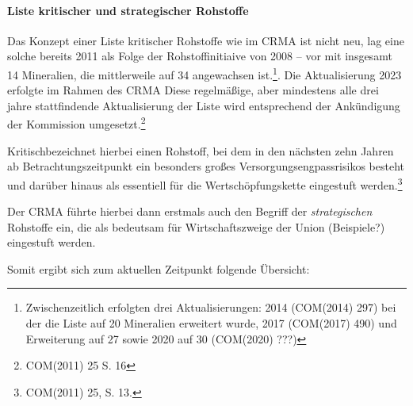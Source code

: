 \documentclass[12pt,a4paper,oneside]{book} %
\begin{document}
	
	\paragraph{Liste kritischer und strategischer Rohstoffe}
	
	Das Konzept einer Liste kritischer Rohstoffe wie im CRMA ist nicht neu, lag eine solche bereits 2011 als Folge der Rohstoffinitiaive von 2008 -- vor mit insgesamt 14 Mineralien, die mittlerweile auf 34 angewachsen ist.\footnote{Zwischenzeitlich erfolgten drei Aktualisierungen: 2014 (COM(2014) 297) bei der die Liste auf 20 Mineralien erweitert wurde, 2017 (COM(2017) 490) und Erweiterung auf 27 sowie 2020 auf 30 (COM(2020) ???)}. Die Aktualisierung 2023 erfolgte im Rahmen des CRMA%
	Diese regelmäßige, aber mindestens alle drei jahre stattfindende Aktualisierung der Liste wird entsprechend der Ankündigung der Kommission umgesetzt.\footnote{COM(2011) 25 S. 16}
	
	\glqq Kritisch\grqq bezeichnet hierbei einen Rohstoff, bei dem in den nächsten zehn Jahren ab Betrachtungszeitpunkt ein besonders großes Versorgungsengpassrisikos besteht und darüber hinaus als essentiell für die Wertschöpfungskette eingestuft werden.\footnote{COM(2011) 25, S. 13.} 
	
	Der CRMA führte hierbei dann erstmals auch den Begriff der \textit{strategischen} Rohstoffe ein, die als bedeutsam für Wirtschaftszweige der Union (Beispiele?) eingestuft werden.
	
Somit ergibt sich zum aktuellen Zeitpunkt folgende Übersicht:
	
\end{document}
